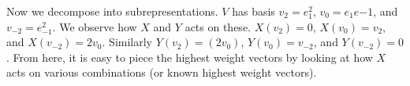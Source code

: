 \begin{example}
\begin{center}
    \end{center}
    Now we decompose into subrepresentations. $V$ has basis $v_2 = e_1^2$, $v_0 = e_1e{-1}$, and $v_{-2} = e_{-1}^2$. We observe how $X$ and $Y$ acts on these.
    $X(v_2) = 0$, $X(v_0) = v_2$, and $X(v_{-2}) = 2v_0$. Similarly $Y(v_2) = (2v_0)$, $Y(v_0) = v_{-2}$, and $Y(v_{-2}) = 0$. From here, it is easy to piece the highest weight vectors by looking at how $X$ acts on various combinations (or known highest weight vectors).
\end{example}

